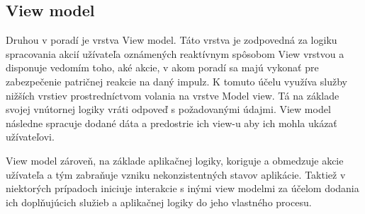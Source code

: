 \subsection{View model}\label{ViewModel}

Druhou v poradí je vrstva View model. Táto vrstva je zodpovedná za logiku spracovania akcií užívateľa oznámených reaktívnym spôsobom View vrstvou a disponuje vedomím toho, aké akcie, v akom poradí sa majú vykonať pre zabezpečenie patričnej reakcie na daný impulz. K tomuto účelu využíva služby nižších vrstiev prostredníctvom volania na vrstve Model view. Tá na základe svojej vnútornej logiky vráti odpoveď s požadovanými údajmi. View model následne spracuje dodané dáta a predostrie ich view-u aby ich mohla ukázať užívateľovi.

View model zároveň, na základe aplikačnej logiky, koriguje a obmedzuje akcie užívateľa a tým zabraňuje vzniku nekonzistentných stavov aplikácie. Taktiež v niektorých prípadoch iniciuje interakcie s inými view modelmi za účelom dodania ich doplňujúcich služieb a aplikačnej logiky do jeho vlastného procesu.


